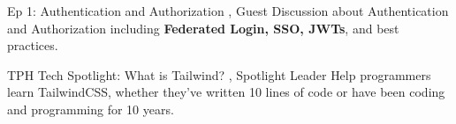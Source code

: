 

\begin{cventries}


  \cventrynoposition
    {Ep 1: Authentication and Authorization} %
    {, Guest}
    {}
    {Discussion about Authentication and Authorization including \textbf{Federated Login, SSO, JWTs}, and best practices.}

\cventrynoposition
    {TPH Tech Spotlight: What is Tailwind?} %
    {, Spotlight Leader}
    {}
    {Help programmers learn TailwindCSS, whether they've written 10 lines of code or have been coding and programming for 10 years.}


\end{cventries}

